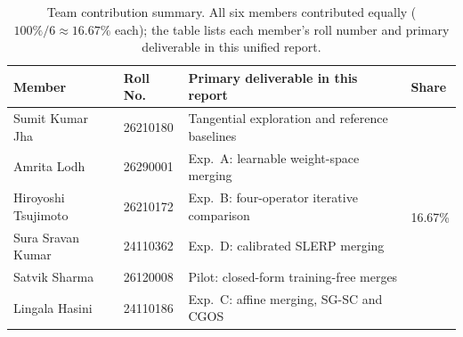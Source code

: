 \documentclass[10pt,a4paper]{article}
\begin{document}
\begin{table}[h]
\centering
\footnotesize
\begin{tabular}{L{3.6cm} L{1.7cm} L{7.4cm} L{1.2cm}}
\toprule
Member & Roll No. & Primary deliverable in this report & Share \\
\midrule
Sumit Kumar Jha & 26210180
  & Tangential exploration and reference baselines &  \\
Amrita Lodh & 26290001
  & Exp.~A: learnable weight-space merging & \\
Hiroyoshi Tsujimoto & 26210172
  & Exp.~B: four-operator iterative comparison & \\
Sura Sravan Kumar & 24110362
  & Exp.~D: calibrated SLERP merging & \\
Satvik Sharma & 26120008
  & Pilot: closed-form training-free merges & \\
Lingala Hasini & 24110186
  & Exp.~C: affine merging, SG-SC and CGOS & \\
\bottomrule
\end{tabular}
\caption{Team contribution summary. All six members contributed equally
($100\%/6 \approx 16.67\%$ each); the table lists each member's roll number and
primary deliverable in this unified report.}
\label{tab:contrib}
\end{table}
\end{document}
